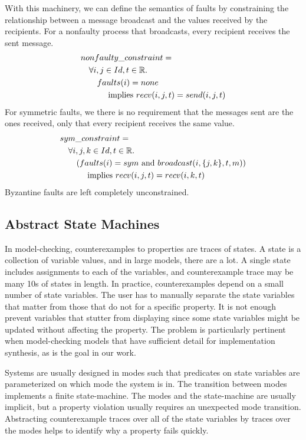 \documentclass{llncs/llncs}
\newcommand{\lee}[1]{ } %
\newcommand{\lee}[1]{ {\color{blue}$<$lee: #1$>$} } %
\begin{document}
With this machinery, we can define the semantics of faults by constraining the relationship between a message broadcast and the values received by the recipients. For a nonfaulty process that broadcasts, every recipient receives the sent message.
\begin{align*}
&nonfaulty\_constraint =\\
  &\quad \forall i, j \in Id, t \in \mathbb{R}.\\
  &\quad\quad faults(i) = none\\
  &\quad\quad\quad \textnormal{ implies } recv(i, j, t) = send(i, j, t)
\end{align*}
\noindent
For symmetric faults, we there is no requirement that the messages sent are the ones received, only that every recipient receives the same value.
\begin{align*}
&sym\_constraint =\\
  &\quad \forall i, j, k \in Id, t \in \mathbb{R}.\\
  &\quad\quad (faults(i) = sym \textnormal{ and } broadcast(i, \{j, k\}, t, m))\\
  &\quad\quad\quad \textnormal{ implies } recv(i, j, t) = recv(i, k, t)
\end{align*}
\noindent
Byzantine faults are left completely unconstrained.

\lee{Talk about how to define an MFA in the environment}

\subsection{Abstract State Machines}\label{sec:abstract}\label{sec:asms}
In model-checking, counterexamples to properties are traces of states. A state is a collection of variable values, and in large models, there are a lot. A single state includes assignments to each of the variables, and counterexample trace may be many 10s of states in length. In practice, counterexamples depend on a small number of state variables. The user has to manually separate the state variables that matter from those that do not for a specific property. It is not enough prevent variables that stutter from displaying since some state variables might be updated without affecting the property. The problem is particularly pertinent when model-checking models that have sufficient detail for implementation synthesis, as is the goal in our work.

Systems are usually designed in modes such that predicates on state variables are parameterized on which mode the system is in. The transition between modes implements a finite state-machine. The modes and the state-machine are usually implicit, but a property violation usually requires an unexpected mode transition. Abstracting counterexample traces over all of the state variables by traces over the modes helps to identify why a property fails quickly.
\end{document}
